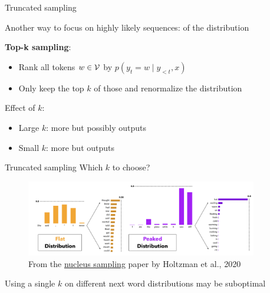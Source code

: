 \documentclass[usenames,dvipsnames,notes,11pt,aspectratio=169,hyperref={colorlinks=true, linkcolor=blue}]{beamer}
\begin{document}
\begin{frame}
    {Truncated sampling}

    Another way to focus on highly likely sequences:  of the distribution

    \textbf{Top-k sampling}:\\
    \begin{itemize}
        \item Rank all tokens $w\in\mathcal{V}$ by $p(y_t=w\mid y_{<t},x)$
        \item Only keep the top $k$ of those and renormalize the distribution
    \end{itemize}

    Effect of $k$:\\
    \begin{itemize}
        \item Large $k$: more  but possibly  outputs
        \item Small $k$: more  but  outputs
    \end{itemize}
\end{frame}

\begin{frame}
    {Truncated sampling}
    Which $k$ to choose?
    \begin{figure}
        \includegraphics[width=0.9\textwidth]{figures/dynamic-k}
        \caption{From the \href{https://arxiv.org/pdf/1904.09751.pdf}{nucleus sampling} paper by Holtzman et al., 2020}
    \end{figure}
    Using a single $k$ on different next word distributions may be suboptimal
\end{frame}
\end{document}
